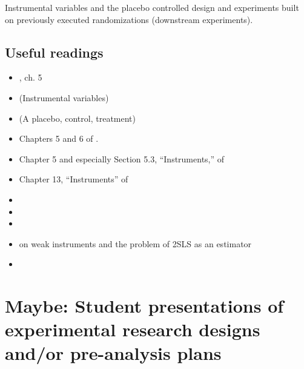 \documentclass[10pt]{article}
\providecommand{\tightlist}{%
  \setlength{\itemsep}{0pt}\setlength{\parskip}{0pt}}
\begin{document}
Instrumental variables and the placebo controlled design and experiments built
on previously executed randomizations (downstream experiments).

\subsection{Useful readings}
\begin{itemize}
    \tightlist
    \item {}, ch. 5
    \item \href{https://doi.org/10.1111/ecca.12168}{} (Instrumental variables) %
    \item \href{https://www-cambridge-org.eui.idm.oclc.org/core/services/aop-cambridge-core/content/view/S0003055419000923}{} (A placebo, control, treatment)
    \item Chapters 5 and 6 of .
    \item Chapter 5 and especially Section 5.3, ``Instruments,'' of 
    \item Chapter 13, ``Instruments'' of 
    \item {}
    \item {}
    \item {}
    \item {} on weak instruments and the problem of 2SLS as an estimator
    \item {}
\end{itemize}

\section{Maybe: Student presentations of experimental research designs and/or pre-analysis plans}
\newpage

\printbibliography[title=References]
\end{document}
